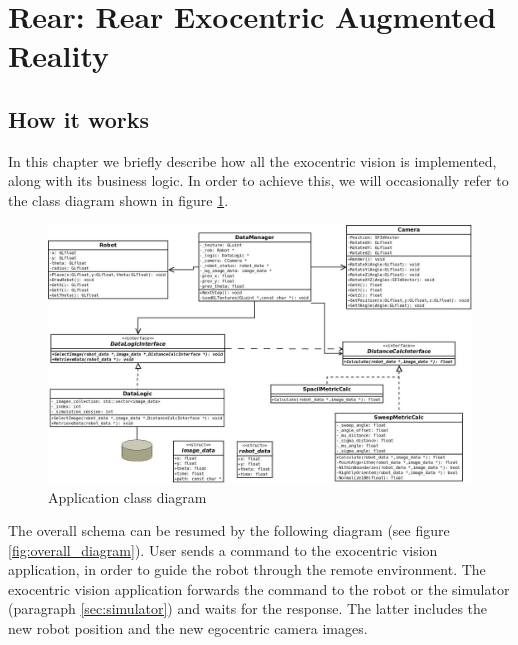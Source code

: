 \section{Rear: Rear Exocentric Augmented Reality}
\label{sec:rear}

\subsection{How it works}
In this chapter we briefly describe how all the exocentric vision
is implemented, along with its business logic. In order to achieve
this, we will occasionally refer to the class diagram shown in figure
\ref{fig:class_diagram}.
%
\begin{figure}[!h]
  \begin{center}
    \includegraphics[width=400pt]{img/class_diagram.jpeg}  %
    \caption{Application class diagram}
    \label{fig:class_diagram}
  \end{center}
\end{figure}
%
The overall schema can be resumed by the following diagram (see figure
\ref{fig:overall_diagram}). User sends a command to the exocentric vision
application, in order to guide the robot through the remote environment.
The exocentric vision application forwards the command to the robot or the
simulator (paragraph \ref{sec:simulator}) and waits for the response.
The latter includes the new robot position and the new egocentric camera images.
%

